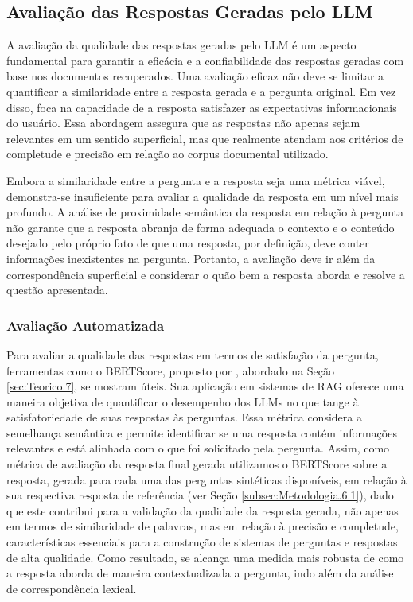 \subsection{Avaliação das Respostas Geradas pelo LLM}
\label{subsec:Metodologia.6.3}
A avaliação da qualidade das respostas geradas pelo \ac{LLM} é um aspecto fundamental para garantir a eficácia e a confiabilidade das respostas geradas com base nos documentos recuperados. Uma avaliação eficaz não deve se limitar a quantificar a similaridade entre a resposta gerada e a pergunta original. Em vez disso, foca na capacidade de a resposta satisfazer as expectativas informacionais do usuário. Essa abordagem assegura que as respostas não apenas sejam relevantes em um sentido superficial, mas que realmente atendam aos critérios de completude e precisão em relação ao corpus documental utilizado.

Embora a similaridade entre a pergunta e a resposta seja uma métrica viável, demonstra-se insuficiente para avaliar a qualidade da resposta em um nível mais profundo. A análise de proximidade semântica da resposta em relação à pergunta não garante que a resposta abranja de forma adequada o contexto e o conteúdo desejado pelo próprio fato de que uma resposta, por definição, deve conter informações inexistentes na pergunta. Portanto, a avaliação deve ir além da correspondência superficial e considerar o quão bem a resposta aborda e resolve a questão apresentada.

\subsubsection{Avaliação Automatizada}
\label{subsubsec:Metodologia.6.3.1}
Para avaliar a qualidade das respostas em termos de satisfação da pergunta, ferramentas como o BERTScore, proposto por , abordado na Seção \ref{sec:Teorico.7}, se mostram úteis. Sua aplicação em sistemas de \ac{RAG} oferece uma maneira objetiva de quantificar o desempenho dos \ac{LLM}s no que tange à satisfatoriedade de suas respostas às perguntas. Essa métrica considera a semelhança semântica e permite identificar se uma resposta contém informações relevantes e está alinhada com o que foi solicitado pela pergunta. Assim, como métrica de avaliação da resposta final gerada utilizamos o BERTScore sobre a resposta, gerada para cada uma das perguntas sintéticas disponíveis, em relação à sua respectiva resposta de referência (ver Seção \ref{subsec:Metodologia.6.1}), dado que este contribui para a validação da qualidade da resposta gerada, não apenas em termos de similaridade de palavras, mas em relação à precisão e completude, características essenciais para a construção de sistemas de perguntas e respostas de alta qualidade. Como resultado, se alcança uma medida mais robusta de como a resposta aborda de maneira contextualizada a pergunta, indo além da análise de correspondência lexical.


